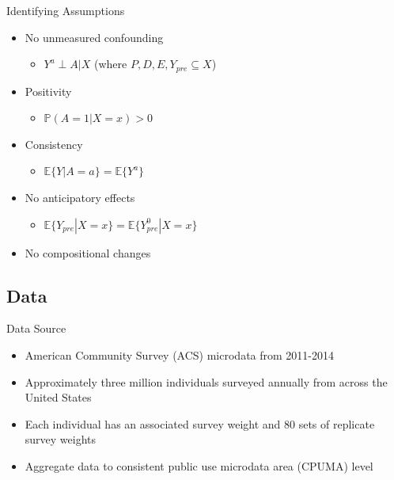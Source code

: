 \documentclass[hyperref={pdfpagelabels=false}]{beamer}
\begin{document}
\begin{frame}{Identifying Assumptions}

\begin{itemize}
    \item No unmeasured confounding
    \begin{itemize}
        \item $Y^a \perp A | X$ (where $P, D, E, Y_{pre} \subseteq X$) \bigskip 
    \end{itemize}
    \item Positivity
    \begin{itemize}
        \item $\mathbb{P}(A = 1 | X = x) > 0$  \bigskip 
    \end{itemize}
    \item Consistency
    \begin{itemize}
        \item $\mathbb{E}\{Y | A = a\} = \mathbb{E}\{Y^a\}$ \bigskip 
    \end{itemize}
    \item No anticipatory effects
    \begin{itemize}
        \item $\mathbb{E}\{Y_{pre} | X = x\} = \mathbb{E}\{Y^0_{pre} | X = x\}$ \bigskip 
    \end{itemize}
        \item No compositional changes
\end{itemize}

\end{frame}

\subsection{Data}

\begin{frame}{Data Source}
    \begin{itemize}
    \item American Community Survey (ACS) microdata from 2011-2014 \bigskip 
    \item Approximately three million individuals surveyed annually from across the United States \bigskip 
    \item Each individual has an associated survey weight and 80 sets of replicate survey weights \bigskip 
    \item Aggregate data to consistent public use microdata area (CPUMA) level
    \end{itemize}
\end{frame}   
\end{document}
